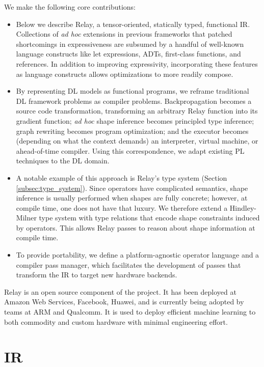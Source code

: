 We make the following core contributions:
\begin{itemize}
  \item
  Below we describe Relay, a tensor-oriented, statically typed,
    functional IR.
  Collections of \textit{ad hoc} extensions in previous frameworks
    that patched shortcomings in expressiveness are subsumed by a handful of well-known language
    constructs like let expressions, ADTs, first-class functions, and references.
  In addition to improving expressivity,
    incorporating these features as language constructs
    allows optimizations to more readily compose.
  \item
  By representing DL models as functional programs, we reframe traditional
    DL framework problems as compiler problems.
  Backpropagation becomes a source code transformation,
    transforming an arbitrary Relay function into its gradient function;
    \textit{ad hoc} shape inference becomes principled type inference;
    graph rewriting becomes program optimization;
    and the executor becomes (depending on what the context demands) an
    interpreter, virtual machine, or ahead-of-time compiler.
  Using this correspondence, we adapt existing
    PL techniques to the DL domain.
  \item
    A notable example of this approach is Relay's type system (Section \ref{subsec:type_system}).
    Since operators have complicated semantics, shape inference is usually
      performed when shapes are fully concrete;
      however, at compile time, one does not have that luxury.
    We therefore extend a Hindley-Milner type system with type relations that encode shape
      constraints induced by operators.
    This allows Relay passes to reason about shape information at compile time.
  \item To provide portability,
    we define a platform-agnostic operator language
    and a compiler pass manager, which facilitates the development of
    passes that transform the IR to target new hardware backends.
\end{itemize}

Relay is an open source component of the \tvm project.
It has been deployed at Amazon Web Services, Facebook, Huawei,
  and is currently being adopted by teams at ARM and Qualcomm.
It is used to deploy efficient machine learning to
  both commodity and custom hardware with minimal
  engineering effort.

\section{IR}

